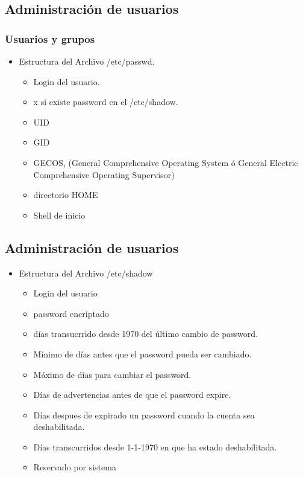 \documentclass{beamer}
\begin{document}
\subsection{Administraci\'on de usuarios}
\begin{frame}
\frametitle{Usuarios y grupos}
\begin{itemize}
	\item Estructura del Archivo /etc/passwd.
		\begin{itemize}
		\item Login del usuario.
		\item x si existe password en el /etc/shadow.
		\item UID
		\item GID
		\item GECOS, (General Comprehensive Operating System \'o General Electric Comprehensive Operating Supervisor) 
		\item directorio HOME
		\item Shell de inicio
		\end{itemize}
\end{itemize}
\end{frame}

\subsection{Administraci\'on de usuarios}
\begin{frame}
\begin{itemize}
\item Estructura del Archivo /etc/shadow
	\begin{itemize}
	\item Login del usuario
	\item password encriptado
	\item d\'ias transucrrido desde 1970 del \'ultimo cambio de password.
	\item M\'inimo de d\'ias antes que el password pueda ser cambiado.
	\item M\'aximo de d\'ias para cambiar el password.
	\item D\'ias de advertencias antes de que el password expire.
	\item D\'ias despues de expirado un password cuando la cuenta sea deshabilitada.
	\item D\'ias transcurridos desde 1-1-1970 en que ha estado deshabilitada.
	\item Reservado por sistema 
	\end{itemize}
\end{itemize}
\end{frame}
\end{document}
